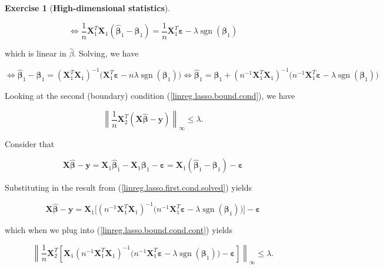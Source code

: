 \documentclass{article}
\theoremstyle{definition}
\newtheorem{exercise}{Exercise}
\theoremstyle{definition}
\theoremstyle{definition}
\theoremstyle{definition}
\renewcommand{\epsilon}{\varepsilon}
\renewcommand{\epsilon}{\varepsilon}
\begin{document}
\begin{exercise}[\textbf{High-dimensional statistics}]
\begin{enumerate}[(a)]
 \[
  \iff \frac{1}{n} \boldsymbol{X}_1^T\boldsymbol{X}_1 (\boldsymbol{\hat{\beta}}_1 - \boldsymbol{\beta}_1)  =  \frac{1}{n} \boldsymbol{X}_1^T \boldsymbol{\epsilon} - \lambda  \operatorname{sgn}(\boldsymbol{\beta}_1)
  \]
  
  which is linear in \(\hat{\beta}\). Solving, we have
  
\begin{equation}\label{linreg.lasso.first.cond.solved}
  \iff  \boldsymbol{\hat{\beta}}_1 - \boldsymbol{\beta}_1  =  ( \boldsymbol{X}_1^T\boldsymbol{X}_1)^{-1} \big( \boldsymbol{X}_1^T \boldsymbol{\epsilon} - n  \lambda  \operatorname{sgn}(\boldsymbol{\beta}_1)\big)   \iff  \boldsymbol{\hat{\beta}}_1   = \boldsymbol{\beta}_1 +   ( n^{-1}\boldsymbol{X}_1^T\boldsymbol{X}_1)^{-1} \big( n^{-1} \boldsymbol{X}_1^T \boldsymbol{\epsilon} -   \lambda  \operatorname{sgn}(\boldsymbol{\beta}_1) \big)
\end{equation}

Looking at the second (boundary) condition (\ref{linreg.lasso.bound.cond}), we have

\begin{equation}\label{linreg.lasso.bound.cond.cont}
\left\lVert \frac{1}{n} \boldsymbol{X}_{2}^T (\boldsymbol{X} \boldsymbol{\hat{\beta}} - \boldsymbol{y}) \right\rVert_\infty \leq \lambda.
\end{equation}

Consider that 

\[
\boldsymbol{X} \boldsymbol{\hat{\beta}}- \boldsymbol{y} = \boldsymbol{X}_1 \boldsymbol{\hat{\beta}}_1 - \boldsymbol{X}_1 \boldsymbol{\beta}_1 - \boldsymbol{\epsilon} = \boldsymbol{X}_1(\boldsymbol{\hat{\beta}}_1 - \boldsymbol{\beta}_1) - \boldsymbol{\epsilon}
\]

Substituting in the result from (\ref{linreg.lasso.first.cond.solved}) yields

\[
\boldsymbol{X} \boldsymbol{\hat{\beta}}- \boldsymbol{y}  = \boldsymbol{X}_1\big[  ( n^{-1} \boldsymbol{X}_1^T\boldsymbol{X}_1)^{-1} \big( n^{-1} \boldsymbol{X}_1^T \boldsymbol{\epsilon} -  \lambda  \operatorname{sgn}(\boldsymbol{\beta}_1)\big)   \big] - \boldsymbol{\epsilon}
\]

which when we plug into (\ref{linreg.lasso.bound.cond.cont}) yields

\[
\left\lVert \frac{1}{n} \boldsymbol{X}_{2}^T \left[\boldsymbol{X}_1  (n^{-1} \boldsymbol{X}_1^T\boldsymbol{X}_1)^{-1} \big( n^{-1} \boldsymbol{X}_1^T \boldsymbol{\epsilon} -  \lambda  \operatorname{sgn}(\boldsymbol{\beta}_1)\big) - \boldsymbol{\epsilon}\right] \right\rVert_\infty \leq \lambda.
\]


\end{enumerate}
\end{exercise}
\end{document}
